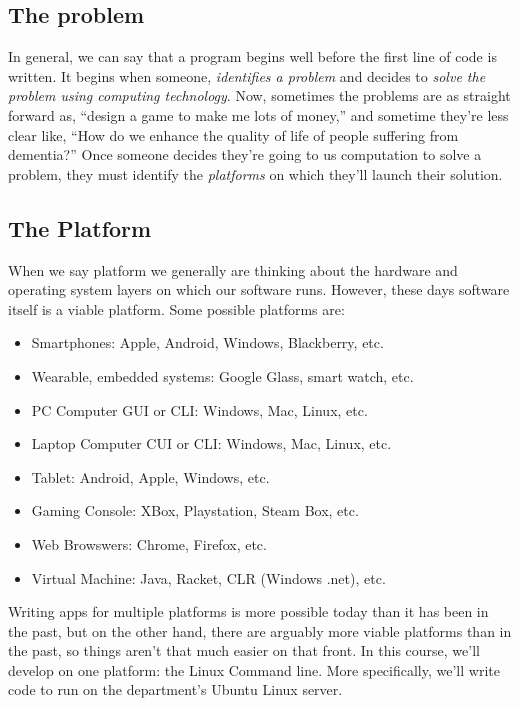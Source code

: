 \documentclass[]{tufte-handout}
\begin{document}
\subsection{The problem}

In general, we can say that a program begins well before the first line of code is written.  It begins when someone, \textit{identifies a problem} and decides to \textit{solve the problem using computing technology}.  Now, sometimes the problems are as straight forward as, ``design a game to make me lots of money,'' and sometime they're less clear like, ``How do we enhance the quality of life of people suffering from dementia?''  Once someone decides they're going to us computation to solve a problem, they must identify the \textit{platforms} on which they'll launch their solution.


\subsection{The Platform}

When we say platform we generally are thinking about the hardware and operating system layers on which our software runs. However, these days software itself is a viable platform.  Some possible platforms are:

\begin{itemize}
\item Smartphones: Apple, Android, Windows, Blackberry, etc.
\item Wearable, embedded systems: Google Glass, smart watch, etc.
\item PC Computer GUI or CLI: Windows, Mac, Linux, etc.
\item Laptop Computer CUI or CLI: Windows, Mac, Linux, etc.
\item Tablet: Android, Apple, Windows, etc.
\item Gaming Console: XBox, Playstation, Steam Box, etc.
\item Web Browswers: Chrome, Firefox, etc.
\item Virtual Machine: Java, Racket, CLR (Windows .net), etc.
\end{itemize}

Writing apps for multiple platforms is more possible today than it has been in the past, but on the other hand, there are arguably more viable platforms than in the past, so things aren't that much easier on that front.  In this course, we'll develop on one platform: the Linux Command line. More specifically, we'll write code to run on the department's Ubuntu Linux server.  
\end{document}
